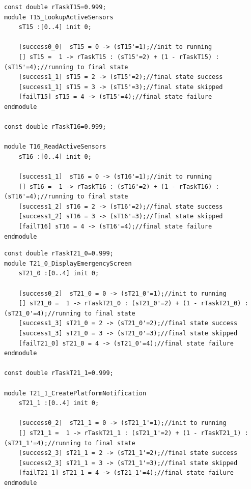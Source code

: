 \begin{lstlisting}[language=Prism, caption={Sequential tasks T15 and T16 as DTMC modules with final transitions of the first module synchronized to the initial transition of the former.},label={lst:PRISM_SEQ_TSKS}] 
const double rTaskT15=0.999;
module T15_LookupActiveSensors
	sT15 :[0..4] init 0;
	
	[success0_0]  sT15 = 0 -> (sT15'=1);//init to running	
	[] sT15 =  1 -> rTaskT15 : (sT15'=2) + (1 - rTaskT15) : (sT15'=4);//running to final state
	[success1_1] sT15 = 2 -> (sT15'=2);//final state success
	[success1_1] sT15 = 3 -> (sT15'=3);//final state skipped
	[failT15] sT15 = 4 -> (sT15'=4);//final state failure
endmodule

const double rTaskT16=0.999;

module T16_ReadActiveSensors
	sT16 :[0..4] init 0;
	
	[success1_1]  sT16 = 0 -> (sT16'=1);//init to running	
	[] sT16 =  1 -> rTaskT16 : (sT16'=2) + (1 - rTaskT16) : (sT16'=4);//running to final state
	[success1_2] sT16 = 2 -> (sT16'=2);//final state success
	[success1_2] sT16 = 3 -> (sT16'=3);//final state skipped
	[failT16] sT16 = 4 -> (sT16'=4);//final state failure
endmodule
\end{lstlisting}

\begin{lstlisting}[language=Prism, caption={Interleaved tasks T21.0 and T21.1 as DTMC modules with initial transition synchronized.},label={lst:PRISM_INT_TSKS}] 
const double rTaskT21_0=0.999;
module T21_0_DisplayEmergencyScreen
	sT21_0 :[0..4] init 0;
	
	[success0_2]  sT21_0 = 0 -> (sT21_0'=1);//init to running	
	[] sT21_0 =  1 -> rTaskT21_0 : (sT21_0'=2) + (1 - rTaskT21_0) : (sT21_0'=4);//running to final state
	[success1_3] sT21_0 = 2 -> (sT21_0'=2);//final state success
	[success1_3] sT21_0 = 3 -> (sT21_0'=3);//final state skipped
	[failT21_0] sT21_0 = 4 -> (sT21_0'=4);//final state failure
endmodule

const double rTaskT21_1=0.999;

module T21_1_CreatePlatformNotification
	sT21_1 :[0..4] init 0;
	
	[success0_2]  sT21_1 = 0 -> (sT21_1'=1);//init to running
	[] sT21_1 =  1 -> rTaskT21_1 : (sT21_1'=2) + (1 - rTaskT21_1) : (sT21_1'=4);//running to final state
	[success2_3] sT21_1 = 2 -> (sT21_1'=2);//final state success
	[success2_3] sT21_1 = 3 -> (sT21_1'=3);//final state skipped
	[failT21_1] sT21_1 = 4 -> (sT21_1'=4);//final state failure
endmodule
\end{lstlisting}


